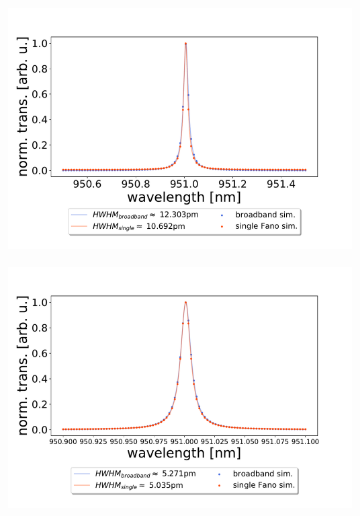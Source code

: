 \begin{figure}[h!]
    \centering
    \begin{subfigure}[b]{0.49\textwidth}
        \includegraphics[width=\textwidth]{figures/sim_single_vs_broadband_300um.pdf}
        \caption{}
        \label{fig:single_vs_broadband_simulation_300um}
    \end{subfigure}
    \begin{subfigure}[b]{0.49\textwidth}
        \includegraphics[width=\textwidth]{figures/sim_single_vs_broadband_700um.pdf}
        \caption{}
        \label{fig:single_vs_broadband_simulation_700um}
    \end{subfigure}
\end{figure}

